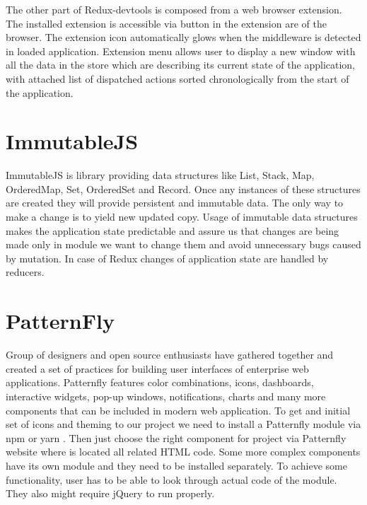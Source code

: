 The other part of Redux-devtools is composed from a web browser extension. The installed extension is accessible via button in the extension are of the browser. The extension icon automatically glows when the middleware is detected in loaded application. Extension menu allows user to display a new window with all the data in the store which are describing its current state of the application, with attached list of dispatched actions sorted chronologically from the start of the application.

\section{ImmutableJS}
ImmutableJS \cite{immutable} is library providing data structures like List, Stack, Map, OrderedMap, Set, OrderedSet and Record. Once any instances of these structures are created they will provide persistent and immutable data. The only way to make a change is to yield new updated copy. Usage of immutable data structures makes the application state predictable and assure us that changes are being made only in module we want to change them and avoid unnecessary bugs caused by mutation. In case of Redux changes of application state are handled by reducers.

\section{PatternFly}
Group of designers and open source enthusiasts have gathered together and created a set of practices for building user interfaces of enterprise web applications. Patternfly features color combinations, icons, dashboards, interactive widgets, pop-up windows, notifications, charts and many more components that can be included in modern web application. To get and initial set of icons and theming to our project we need to install a Patternfly module via npm \cite{npm} or yarn \cite{yarn}. Then just choose the right component for project via Patternfly website \cite{Patternfly} where is located all related HTML code. Some more complex components have its own module and they need to be installed separately. To achieve some functionality, user has to be able to look through actual code of the module. They also might require jQuery to run properly.

